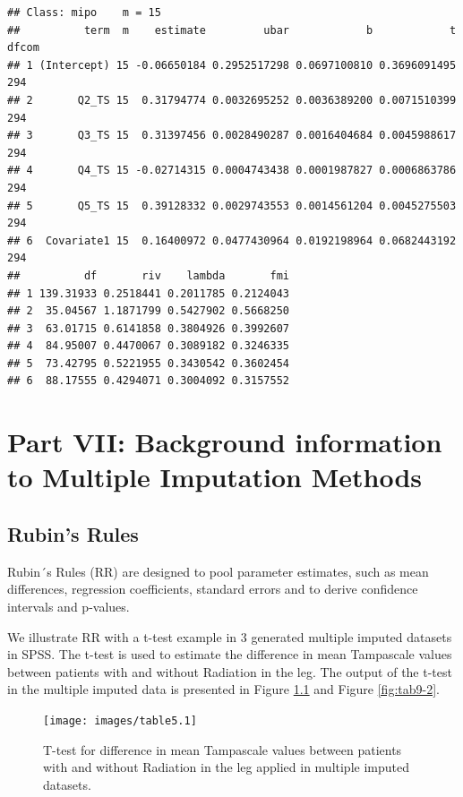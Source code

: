 \documentclass[
]{book}
\begin{document}
\begin{verbatim}
## Class: mipo    m = 15 
##          term  m    estimate         ubar            b            t dfcom
## 1 (Intercept) 15 -0.06650184 0.2952517298 0.0697100810 0.3696091495   294
## 2       Q2_TS 15  0.31794774 0.0032695252 0.0036389200 0.0071510399   294
## 3       Q3_TS 15  0.31397456 0.0028490287 0.0016404684 0.0045988617   294
## 4       Q4_TS 15 -0.02714315 0.0004743438 0.0001987827 0.0006863786   294
## 5       Q5_TS 15  0.39128332 0.0029743553 0.0014561204 0.0045275503   294
## 6  Covariate1 15  0.16400972 0.0477430964 0.0192198964 0.0682443192   294
##          df       riv    lambda       fmi
## 1 139.31933 0.2518441 0.2011785 0.2124043
## 2  35.04567 1.1871799 0.5427902 0.5668250
## 3  63.01715 0.6141858 0.3804926 0.3992607
## 4  84.95007 0.4470067 0.3089182 0.3246335
## 5  73.42795 0.5221955 0.3430542 0.3602454
## 6  88.17555 0.4294071 0.3004092 0.3157552
\end{verbatim}

\hypertarget{part-part-vii-background-information-to-multiple-imputation-methods}{%
\part{Part VII: Background information to Multiple Imputation Methods}\label{part-part-vii-background-information-to-multiple-imputation-methods}}

\hypertarget{rubins-rules}{%
\chapter{Rubin's Rules}\label{rubins-rules}}

Rubin´s Rules (RR) are designed to pool parameter estimates, such as mean differences, regression coefficients, standard errors and to derive confidence intervals and p-values.

We illustrate RR with a t-test example in 3 generated multiple imputed datasets in SPSS. The t-test is used to estimate the difference in mean Tampascale values between patients with and without Radiation in the leg. The output of the t-test in the multiple imputed data is presented in Figure \ref{fig:tab9-1} and Figure \ref{fig:tab9-2}.

\begin{figure}

{\centering \texttt{[image: images/table5.1]} 

}

\caption{T-test for difference in mean Tampascale values between patients with and without Radiation in the leg applied in multiple imputed datasets.}\label{fig:tab9-1}
\end{figure}
\end{document}

